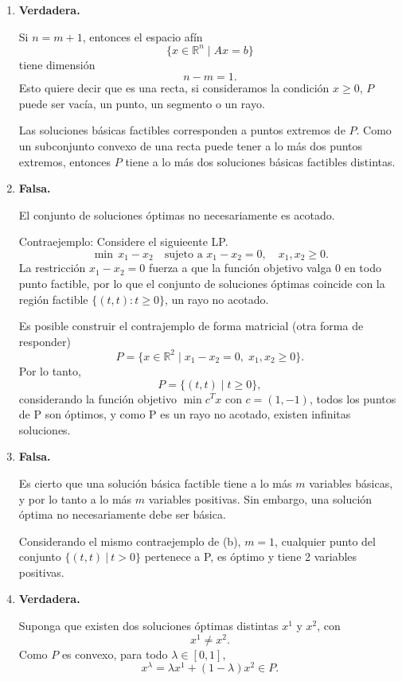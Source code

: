 \begin{enumerate}
    \item[(a)] \textbf{Verdadera.}

    Si \(n=m+1\), entonces el espacio afín
    \[
    \{x\in\mathbb{R}^n\mid Ax=b\}
    \]
    tiene dimensión
    \[
    n-m=1.
    \]
    Esto quiere decir que es una recta, si consideramos la condición \(x\geq 0\), \(P\) puede ser vacía, un punto, un segmento o un rayo.

    Las soluciones básicas factibles corresponden a puntos extremos de \(P\).
    Como un subconjunto convexo de una recta puede tener a lo más dos puntos extremos, entonces \(P\) tiene a lo más dos soluciones básicas factibles distintas.

    \item[(b)] \textbf{Falsa.}

    El conjunto de soluciones óptimas no necesariamente es acotado.


    Contraejemplo: Considere el siguieente LP.
    \[
    \min \, x_1 - x_2 \quad \text{sujeto a } x_1 - x_2 = 0,\quad x_1,x_2\ge 0.
    \]
    La restricción \(x_1 - x_2 = 0\) fuerza a que la función objetivo valga \(0\) en todo punto factible, por lo que el conjunto de soluciones óptimas coincide con la región factible \(\{(t,t) : t\ge 0\}\), un rayo no acotado.
    
    Es posible construir el contrajemplo de forma matricial (otra forma de responder)
        \[
    P=\{x\in\mathbb{R}^2\mid x_1-x_2=0,\; x_1,x_2\geq 0\}.
    \]
    Por lo tanto,
    \[
    P=\{(t,t)\mid t\geq 0\},
    \]
    considerando la función objetivo $\min c^Tx$ con $c=(1,-1)$, todos los puntos de P son óptimos, y como P es un rayo no acotado, existen infinitas soluciones.

    \item[(c)] \textbf{Falsa.}

    Es cierto que una solución básica factible tiene a lo más \(m\) variables básicas, y por lo tanto a lo más \(m\) variables positivas. Sin embargo, una solución óptima no necesariamente debe ser básica.

    Considerando el mismo contraejemplo de (b), $m=1$, cualquier punto del conjunto $\{(t,t)\:|\:t>0\}$ pertenece a P, es óptimo y tiene 2 variables positivas.


    \item[(d)] \textbf{Verdadera.}

    Suponga que existen dos soluciones óptimas distintas \(x^1\) y \(x^2\), con
    \[
    x^1\neq x^2.
    \]
    Como \(P\) es convexo, para todo \(\lambda\in[0,1]\),
    \[
    x^\lambda=\lambda x^1+(1-\lambda)x^2\in P.
    \]


\end{enumerate}
